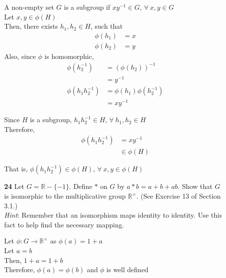 \documentclass[paper=usletter, fontsize=12pt]{article}
\begin{document}
\begin{itemize}
\begin{itemize}
\begin{cproof}
                A non-empty set $G$ is a subgroup if $xy^{-1}\in G$, $\forall \
                x,y\in G$\\
                Let $x,y \in \phi(H)$\\
                Then, there exists $h_1,h_2 \in H$, such that
                \begin{align*}
                    \phi(h_1) & = x\\
                    \phi(h_2) & = y
                \end{align*}
                Also, since $\phi$ is homomorphic,
                \begin{align*}
                    \phi(h_2^{-1}) & = (\phi(h_2))^{-1}\\
                    & = y^{-1}\\
                    \phi(h_1h_2^{-1}) & = \phi(h_1)\phi(h_2^{-1})\\
                    & = xy^{-1}
                \end{align*}

                Since $H$ is a subgroup, $h_1h_2^{-1}\in H$, $\forall \ h_1,h_2
                \in H$\\
                Therefore,
                \begin{align*}
                    \phi(h_1h_2^{-1}) & = xy^{-1}\\
                    & \in \phi(H)
                \end{align*}

                That is, $\phi(h_1h_2^{-1}) \in \phi(H)$, $\forall \ x,y \in
                \phi(H)$ \qedhere

            \end{cproof}

            \item[\textbf{24}] Let $G = \mathbb{R} - \{-1\}$. Define $*$ on $G$
            by $a*b = a+b+ab$. Show that $G$ is isomorphic to the
            multiplicative group $\mathbb{R}^{\times}$. (See Exercise 13 of
            Section 3.1.) \\ \textit{Hint}: Remember that an isomorphism maps
            identity to identity. Use this fact to help find the necessary
            mapping.
            \begin{cproof}

                Let $\phi: G \rightarrow \mathbb{R}^{\times}$ as
                $\phi(a)=1+a$\\

                Let $a=b$\\
                Then, $1+a=1+b$\\
                Therefore, $\phi(a)=\phi(b)$ and $\phi$ is well defined\\


\end{cproof}
\end{itemize}
\end{itemize}
\end{document}

